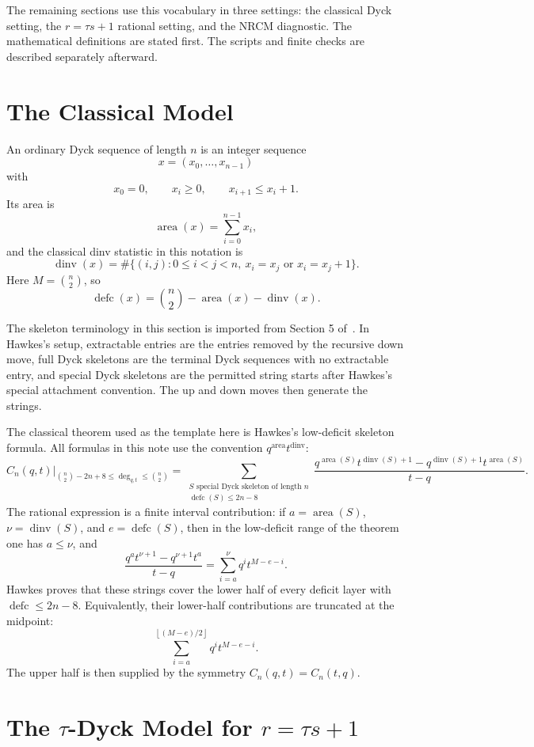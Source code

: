 \documentclass{article}
\newcommand{\defc}{\operatorname{defc}}
\newcommand{\dinv}{\operatorname{dinv}}
\newcommand{\area}{\operatorname{area}}
\begin{document}
The remaining sections use this vocabulary in three settings: the classical
Dyck setting, the \(r=\tau s+1\) rational setting, and the NRCM diagnostic.
The mathematical definitions are stated first.  The scripts and finite checks
are described separately afterward.

\section{The Classical Model}

An ordinary Dyck sequence of length \(n\) is an integer sequence
\[
  x=(x_0,\ldots,x_{n-1})
\]
with
\[
  x_0=0,\qquad x_i\ge0,\qquad x_{i+1}\le x_i+1.
\]
Its area is
\[
  \area(x)=\sum_{i=0}^{n-1}x_i,
\]
and the classical dinv statistic in this notation is
\[
  \dinv(x)=\#\{(i,j):0\le i<j<n,\ x_i=x_j\text{ or }x_i=x_j+1\}.
\]
Here \(M=\binom n2\), so
\[
  \defc(x)=\binom n2-\area(x)-\dinv(x).
\]

The skeleton terminology in this section is imported from Section 5
of~\cite{Hawkes2026DyckSymmetric}.  In Hawkes's setup, extractable entries are
the entries removed by the recursive down move, full Dyck skeletons are the
terminal Dyck sequences with no extractable entry, and special Dyck skeletons
are the permitted string starts after Hawkes's special attachment convention.
The \(\mathrm{up}\) and \(\mathrm{down}\) moves then generate the strings.

The classical theorem used as the template here is Hawkes's low-deficit
skeleton formula.  All formulas in this note use the convention
\(q^{\area}t^{\dinv}\):
\[
  \left.C_n(q,t)\right|_{\binom n2-2n+8\le \deg_{q,t}\le \binom n2}
  =
  \sum_{\substack{S\text{ special Dyck skeleton of length }n\\
                  \defc(S)\le 2n-8}}
  \frac{q^{\area(S)}t^{\dinv(S)+1}
        -q^{\dinv(S)+1}t^{\area(S)}}{t-q}.
\]
The rational expression is a finite interval contribution: if
\(a=\area(S)\), \(\nu=\dinv(S)\), and \(e=\defc(S)\), then in the low-deficit
range of the theorem one has \(a\le\nu\), and
\[
  \frac{q^a t^{\nu+1}-q^{\nu+1}t^a}{t-q}
  =
  \sum_{i=a}^{\nu}q^i t^{M-e-i}.
\]
Hawkes proves that these strings cover the lower half of every deficit layer
with \(\defc\le2n-8\).  Equivalently, their lower-half contributions are
truncated at the midpoint:
\[
  \sum_{i=a}^{\left\lfloor(M-e)/2\right\rfloor} q^i t^{M-e-i}.
\]
The upper half is then supplied by the symmetry \(C_n(q,t)=C_n(t,q)\).

\section{The \(\tau\)-Dyck Model for \(r=\tau s+1\)}
\end{document}
